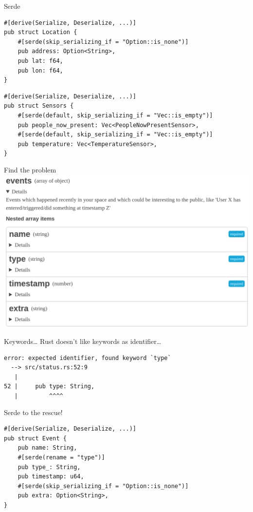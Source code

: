 \begin{frame}[fragile]{Serde}
    \begin{verbatim}
#[derive(Serialize, Deserialize, ...)]
pub struct Location {
    #[serde(skip_serializing_if = "Option::is_none")]
    pub address: Option<String>,
    pub lat: f64,
    pub lon: f64,
}
    \end{verbatim}
    \pause\begin{verbatim}
#[derive(Serialize, Deserialize, ...)]
pub struct Sensors {
    #[serde(default, skip_serializing_if = "Vec::is_empty")]
    pub people_now_present: Vec<PeopleNowPresentSensor>,
    #[serde(default, skip_serializing_if = "Vec::is_empty")]
    pub temperature: Vec<TemperatureSensor>,
}
    \end{verbatim}
\end{frame}

\begin{frame}[fragile]{Find the problem}
    \includegraphics[height=0.98\textheight]{./spaceapi_in_rust/events.png}
\end{frame}

\begin{frame}[c,fragile]{Keywords\ldots}
    Rust doesn't like keywords as identifier\ldots
    \begin{verbatim}
error: expected identifier, found keyword `type`
  --> src/status.rs:52:9
   |
52 |     pub type: String,
   |         ^^^^
    \end{verbatim}
\end{frame}

\begin{frame}[c,fragile]{Serde to the rescue!}
    \begin{verbatim}
#[derive(Serialize, Deserialize, ...)]
pub struct Event {
    pub name: String,
    #[serde(rename = "type")]
    pub type_: String,
    pub timestamp: u64,
    #[serde(skip_serializing_if = "Option::is_none")]
    pub extra: Option<String>,
}
    \end{verbatim}
\end{frame}

